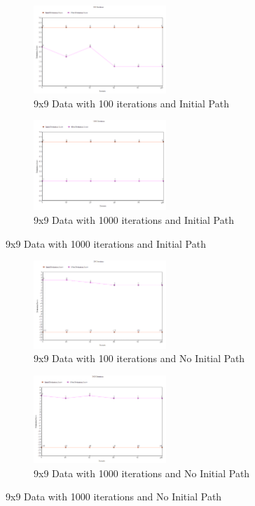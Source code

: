 \documentclass[11pt, oneside]{article}   	%
\begin{document}
\begin{figure}[H]
\centering
\begin{subfigure}{.5\textwidth}
	\centering
	\includegraphics[width=50mm]{9x9restart.png}
	\caption{9x9 Data with 100 iterations and Initial Path}
	\label{fig:method}
\end{subfigure}%
\begin{subfigure}{.5\textwidth}
	\centering
	\includegraphics[width=50mm]{9x9restart2.png}
	\caption{9x9 Data with 1000 iterations and Initial Path}
	\label{fig:method}
\end{subfigure}
\end{figure}

\begin{figure}[H]
\centering
\begin{subfigure}{.5\textwidth}
	\centering
	\includegraphics[width=50mm]{9x9restPath.png}
	\caption{9x9 Data with 100 iterations and No Initial Path}
	\label{fig:method}
\end{subfigure}%
\begin{subfigure}{.5\textwidth}
	\centering
	\includegraphics[width=50mm]{9x9restPath2.png}
	\caption{9x9 Data with 1000 iterations and No Initial Path}
	\label{fig:method}
\end{subfigure}
\end{figure}
\end{document}
